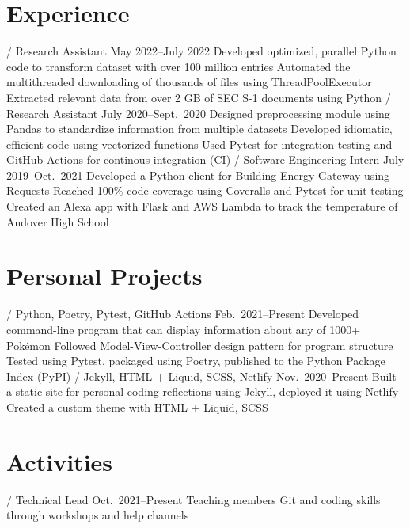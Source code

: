 \section{Experience}
\begin{doutline}
     / Research Assistant
    \hfill May 2022--July 2022
        \2 Developed optimized, parallel Python code to transform dataset with over 100 million entries
        \2 Automated the multithreaded downloading of thousands of files using ThreadPoolExecutor
        \2 Extracted relevant data from over 2 GB of SEC S-1 documents using Python
     / Research Assistant
    \hfill July 2020--Sept.\ 2020
        \2 Designed preprocessing module using Pandas to standardize information from multiple datasets
            \3 Developed idiomatic, efficient code using vectorized functions
            \3 Used Pytest for integration testing and GitHub Actions for continous integration (CI)
     / Software Engineering Intern
    \hfill July 2019--Oct.\ 2021
        \2 Developed a Python client for Building Energy Gateway using Requests
            \3 Reached 100\% code coverage using Coveralls and Pytest for unit testing
        \2 Created an Alexa app with Flask and AWS Lambda to track the temperature of Andover High School
\end{doutline}

\section{Personal Projects}
\begin{doutline}
    \1[Pokésummary] / Python, Poetry, Pytest, GitHub Actions
    \hfill Feb.\ 2021--Present
        \2 Developed command-line program that can display information about any of 1000+ Pokémon
            \3 Followed Model-View-Controller design pattern for program structure
            \3 Tested using Pytest, packaged using Poetry, published to the Python Package Index (PyPI)
     / Jekyll, HTML + Liquid, SCSS, Netlify
    \hfill Nov.\ 2020--Present
        \2 Built a static site for personal coding reflections using Jekyll, deployed it using Netlify
            \3 Created a custom theme with HTML + Liquid, SCSS
\end{doutline}

\section{Activities}
\begin{doutline}
     / Technical Lead
    \hfill Oct.\ 2021--Present
        \2 Teaching members Git and coding skills through workshops and help channels
\end{doutline}
